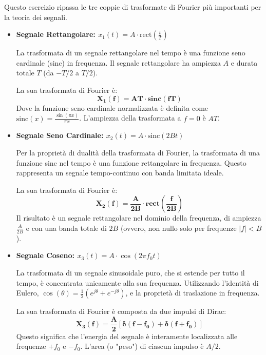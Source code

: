 
\begin{soluzione}{2}
    Questo esercizio ripassa le tre coppie di trasformate di Fourier più importanti per la teoria dei segnali.

    \begin{itemize}
        \item \textbf{Segnale Rettangolare: $x_1(t) = A \cdot \text{rect}\left(\frac{t}{T}\right)$}
        
        La trasformata di un segnale rettangolare nel tempo è una funzione seno cardinale (sinc) in frequenza. Il segnale rettangolare ha ampiezza $A$ e durata totale $T$ (da $-T/2$ a $T/2$).
        
        La sua trasformata di Fourier è:
        \[
            \mathbf{X_1(f) = A T \cdot \text{sinc}(fT)}
        \]
        Dove la funzione seno cardinale normalizzata è definita come $\text{sinc}(x) = \frac{\sin(\pi x)}{\pi x}$. L'ampiezza della trasformata a $f=0$ è $AT$.
        
        \item \textbf{Segnale Seno Cardinale: $x_2(t) = A \cdot \text{sinc}(2Bt)$}
        
        Per la proprietà di dualità della trasformata di Fourier, la trasformata di una funzione sinc nel tempo è una funzione rettangolare in frequenza. Questo rappresenta un segnale tempo-continuo con banda limitata ideale.
        
        La sua trasformata di Fourier è:
        \[
            \mathbf{X_2(f) = \frac{A}{2B} \cdot \text{rect}\left(\frac{f}{2B}\right)}
        \]
        Il risultato è un segnale rettangolare nel dominio della frequenza, di ampiezza $\frac{A}{2B}$ e con una banda totale di $2B$ (ovvero, non nullo solo per frequenze $|f| < B$).
        
        \item \textbf{Segnale Coseno: $x_3(t) = A \cdot \cos(2\pi f_0 t)$}
        
        La trasformata di un segnale sinusoidale puro, che si estende per tutto il tempo, è concentrata unicamente alla sua frequenza. Utilizzando l'identità di Eulero, $\cos(\theta) = \frac{1}{2}(e^{j\theta} + e^{-j\theta})$, e la proprietà di traslazione in frequenza.
        
        La sua trasformata di Fourier è composta da due impulsi di Dirac:
        \[
            \mathbf{X_3(f) = \frac{A}{2} \left[ \delta(f - f_0) + \delta(f + f_0) \right]}
        \]
        Questo significa che l'energia del segnale è interamente localizzata alle frequenze $+f_0$ e $-f_0$. L'area (o "peso") di ciascun impulso è $A/2$.

    \end{itemize}
\end{soluzione}
